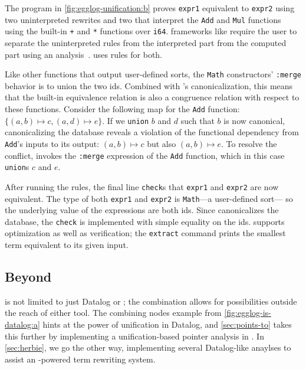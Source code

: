 The program in \autoref{fig:egglog-unification:b}
 proves \lstinline{expr1} equivalent to \lstinline{expr2}
 using two uninterpreted rewrites
 and two that interpret the \lstinline{Add} and \lstinline{Mul} functions
 using the built-in \lstinline{+} and \lstinline{*} functions over \lstinline{i64}.
\eqsat frameworks like \egg 
 require the user to separate the uninterpreted rules
 from the interpreted part from the computed part using
 an \eclass analysis~\cite{egg}.
\egglog uses rules for both.

Like other functions that output user-defined sorts,
 the \lstinline{Math} constructors' \lstinline{:merge} behavior
 is to union the two ids.
Combined with \egglog's canonicalization,
 this means that the built-in equivalence relation is also
 a congruence relation with respect to these functions.
Consider the following map for the
 \lstinline{Add} function:
 $\{ (a, b) \mapsto c, (a, d) \mapsto e \}$.
If we \lstinline{union} $b$ and $d$ 
 such that $b$ is now canonical,
 canonicalizing the database reveals a violation 
 of the functional dependency 
 from \lstinline{Add}'s inputs to its output:
 $(a, b) \mapsto c$ but also $(a, b) \mapsto e$.
To resolve the conflict,
 \egglog invokes the \lstinline{:merge} expression
 of the \lstinline{Add} function,
 which in this case \lstinline{union}s $c$ and $e$.

After running the rules,
 the final line \lstinline{check}s 
 that \lstinline{expr1} and \lstinline{expr2} are now equivalent.
The type of both \lstinline{expr1} and \lstinline{expr2} 
 is \lstinline{Math}---a user-defined sort---%
 so the underlying value of the expressions are both ids.
Since \egglog canonicalizes the database,
 the \lstinline{check} is implemented 
 with simple equality on the ids.
\egglog supports optimization as well as verification;
 the \lstinline{extract} command prints the 
 smallest term equivalent to its given input. 


\subsection{Beyond \eqsat}

\Egglog is not limited to just Datalog or \eqsat;
 the combination allows for possibilities outside the reach of either tool.
The combining nodes example 
 from \autoref{fig:egglog-is-datalog:a}
 hints at the power of unification in Datalog,
 and \autoref{sec:points-to} takes this 
 further by implementing a unification-based pointer analysis in \egglog.
In \autoref{sec:herbie},
 we go the other way, 
 implementing several Datalog-like anaylses
 to assist an \eqsat-powered term rewriting system.

